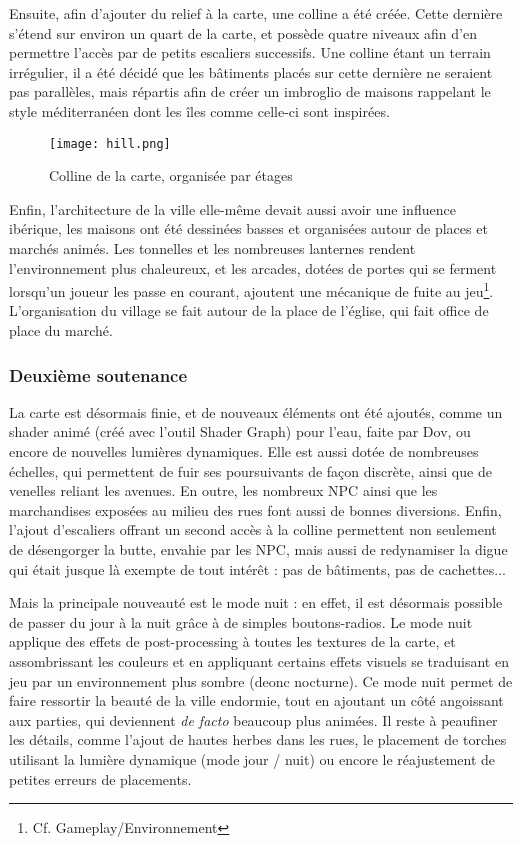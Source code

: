     Ensuite, afin d’ajouter du relief à la carte, une colline a été créée. 
    Cette dernière s’étend sur environ un quart de la carte, et possède quatre 
    niveaux afin d’en permettre l’accès par de petits escaliers successifs. 
    Une colline étant un terrain irrégulier, il a été décidé que les bâtiments 
    placés sur cette dernière ne seraient pas parallèles, mais répartis afin de 
    créer un imbroglio de maisons rappelant le style méditerranéen dont les îles 
    comme celle-ci sont inspirées.


    \begin{figure}[hbt!]
        \centering
        \texttt{[image: hill.png]}
        \caption{Colline de la carte, organisée par étages}
    \end{figure}
    \FloatBarrier


    Enfin, l’architecture de la ville elle-même devait aussi avoir une influence 
    ibérique, les maisons ont été dessinées basses et organisées autour de places et 
    marchés animés. Les tonnelles et les nombreuses lanternes rendent l’environnement 
    plus chaleureux, et les arcades, dotées de portes qui se ferment lorsqu’un joueur 
    les passe en courant, ajoutent une mécanique de fuite au jeu\footnote{Cf. Gameplay/Environnement}. L’organisation du 
    village se fait autour de la place de l’église, qui fait office de place du marché.


\subsubsection{Deuxième soutenance}

    La carte est désormais finie, et de nouveaux éléments ont été ajoutés, comme un shader animé (créé avec l'outil Shader Graph) pour l'eau,
    faite par Dov, ou encore de nouvelles lumières dynamiques. Elle est aussi dotée de nombreuses échelles, qui permettent de fuir ses poursuivants 
    de façon discrète, ainsi que de venelles reliant les avenues.
    En outre, les nombreux NPC ainsi que les marchandises exposées au milieu des rues font aussi de bonnes diversions.
    Enfin, l'ajout d'escaliers offrant un second accès à la colline permettent non seulement de désengorger la butte, envahie par les NPC, mais aussi 
    de redynamiser la digue qui était jusque là exempte de tout intérêt : pas de bâtiments, pas de cachettes...
    
    Mais la principale nouveauté est le mode nuit : en effet, il est désormais possible de passer du jour à la nuit grâce à de simples boutons-radios. 
    Le mode nuit applique des effets de post-processing à toutes les textures de la carte, et assombrissant les couleurs et en appliquant certains effets 
    visuels se traduisant en jeu par un environnement plus sombre (deonc nocturne). 
    Ce mode nuit permet de faire ressortir la beauté de la ville endormie, tout en ajoutant un côté angoissant aux parties,
    qui deviennent \textit{de facto} beaucoup plus animées.
    Il reste à peaufiner les détails, comme l'ajout de hautes herbes dans les rues, le placement de torches utilisant 
    la lumière dynamique (mode jour / nuit) ou encore le réajustement de petites erreurs de placements.

